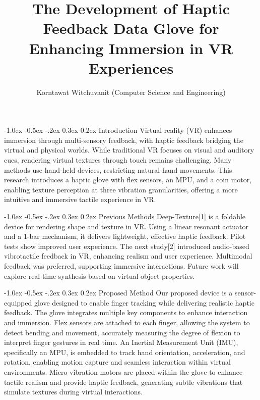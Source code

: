 \documentclass[a4paper,twocolumn]{article}
\title{\textbf{The Development of Haptic Feedback Data Glove for Enhancing Immersion in VR Experiences}}
\author{\small{Korntawat Witchuvanit (Computer Science and Engineering)}}
\date{\vspace{-3em}}
\begin{document}
\small
\maketitle

\makeatletter
\renewcommand\section{\@startsection{section}{1}{\z@}%
  {-1.0ex \@plus -0.5ex \@minus -.2ex}%
  {0.3ex \@plus 0.2ex}%
  {\normalfont\small\bfseries}}
\makeatother



\section{Introduction}
Virtual reality (VR) enhances immersion through multi-sensory feedback, with haptic feedback bridging the virtual and physical worlds. While traditional VR focuses on visual and auditory cues, rendering virtual textures through touch remains challenging. Many methods use hand-held devices, restricting natural hand movements. This research introduces a haptic glove with flex sensors, an MPU, and a coin motor, enabling texture perception at three vibration granularities, offering a more intuitive and immersive tactile experience in VR.

\section{Previous Methods}
Deep-Texture[1] is a foldable device for rendering shape and texture in VR. Using a linear resonant actuator and a 1-bar mechanism, it delivers lightweight, effective haptic feedback. Pilot tests show improved user experience. The next study[2] introduced audio-based vibrotactile feedback in VR, enhancing realism and user experience. Multimodal feedback was preferred, supporting immersive interactions. Future work will explore real-time synthesis based on virtual object properties.

\section{Proposed Method}
Our proposed device is a sensor-equipped glove designed to enable finger tracking while delivering realistic haptic feedback. The glove integrates multiple key components to enhance interaction and immersion. Flex sensors are attached to each finger, allowing the system to detect bending and movement, accurately measuring the degree of flexion to interpret finger gestures in real time. An Inertial Measurement Unit (IMU), specifically an MPU, is embedded to track hand orientation, acceleration, and rotation, enabling motion capture and seamless interaction within virtual environments. Micro-vibration motors are placed within the glove to enhance tactile realism and provide haptic feedback, generating subtle vibrations that simulate textures during virtual interactions.
\end{document}
